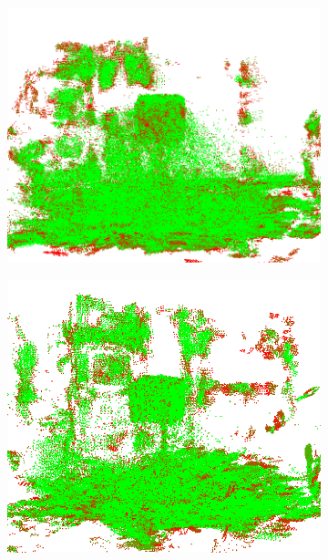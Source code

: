 \begin{figure}[h!tb]
    \centering
    \begin{subfigure}[b]{0.4\textwidth}
        \centering
        \includegraphics[width=0.9\linewidth]{images/eval-clouds-quant2}
    \end{subfigure}%
    \begin{subfigure}[b]{0.4\textwidth}
        \centering
        \includegraphics[width=0.9\linewidth]{images/eval-clouds-epsilon}
    \end{subfigure}%


\end{figure}
